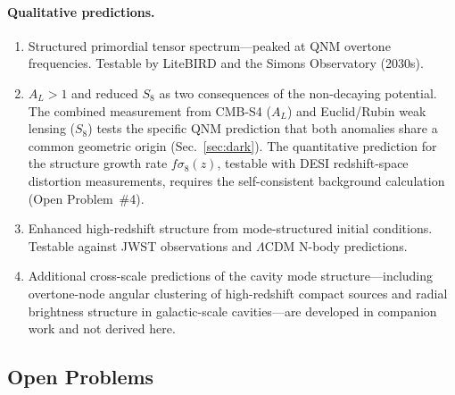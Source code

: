 \documentclass[aps,prd,twocolumn,superscriptaddress,showpacs,preprintnumbers,amsmath,amssymb,nofootinbib]{revtex4-2}
\newcommand{\lcdm}{$\Lambda$CDM}
\begin{document}
\paragraph{Qualitative predictions.}
\begin{enumerate}
\item[(iv)] Structured primordial tensor spectrum---peaked at QNM overtone frequencies. Testable by LiteBIRD and the Simons Observatory (2030s).

\item[(v)] $A_L > 1$ and reduced $S_8$ as two consequences of the non-decaying potential. The combined measurement from CMB-S4 ($A_L$) and Euclid/Rubin weak lensing ($S_8$) tests the specific QNM prediction that both anomalies share a common geometric origin (Sec.~\ref{sec:dark}). The quantitative prediction for the structure growth rate $f\sigma_8(z)$, testable with DESI redshift-space distortion measurements, requires the self-consistent background calculation (Open Problem~\#4).

\item[(vi)] Enhanced high-redshift structure from mode-structured initial conditions. Testable against JWST observations and \lcdm{} N-body predictions.

\item[(vii)] Additional cross-scale predictions of the cavity mode structure---including overtone-node angular clustering of high-redshift compact sources and radial brightness structure in galactic-scale cavities---are developed in companion work and not derived here.
\end{enumerate}


\subsection{Open Problems}
\label{sec:open}
\end{document}
